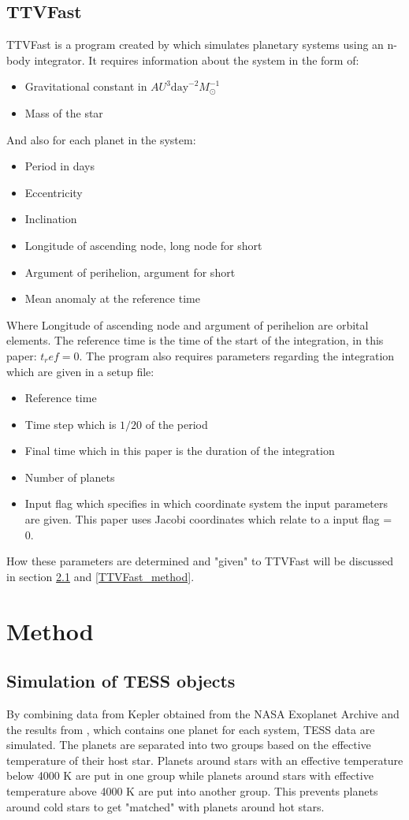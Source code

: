 \documentclass[12pt]{report}
\begin{document}
	
\section{TTVFast}
	TTVFast is a program created by \cite{2014ApJ...787..132D} which simulates planetary systems using an n-body integrator. It requires information about the system in the form of:
	\begin{itemize}
		\item Gravitational constant in $AU^3 \mathrm{day}^{-2}M_{\odot}^{-1}$
		\item Mass of the star 
		
	\end{itemize}
	And also for each planet in the system:
	\begin{itemize}
		\item Period in days 
		\item Eccentricity
		\item Inclination 
		\item Longitude of ascending node, long node for short 
		\item Argument of perihelion, argument for short 
		\item Mean anomaly at the reference time 
	\end{itemize}
	Where Longitude of ascending node and argument of perihelion are orbital elements. The reference time is the time of the start of the integration, in this paper: $t_ref=0$. The program also requires parameters regarding the integration which are given in a setup file:
	\begin{itemize}
		\item Reference time
		\item Time step which is $1/20$ of the period
		\item Final time which in this paper is the duration of the integration
		\item Number of planets
		\item Input flag which specifies in which coordinate system the input parameters are given. This paper uses Jacobi coordinates which relate to a input flag = 0.
	\end{itemize}
	How these parameters are determined and "given" to TTVFast will be discussed in section \ref{simTESS} and \ref{TTVFast_method}.
\chapter{Method}

\section{Simulation of TESS objects}
\label{simTESS}
	By combining data from Kepler obtained from the NASA Exoplanet Archive and the results from \cite{2015ApJ...809...77S}, which contains one planet for each system, TESS data are simulated. The planets are separated into two groups based on the effective temperature of their host star. Planets around stars with an effective temperature below 4000 K are put in one group while planets around stars with effective temperature above 4000 K are put into another group. This prevents planets around cold stars to get "matched" with planets around hot stars. 
	
\end{document}
